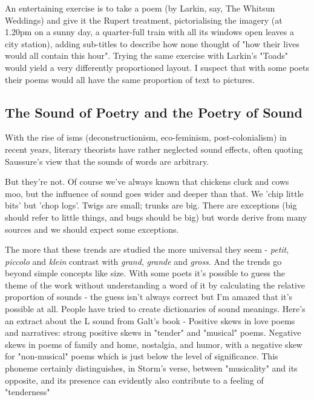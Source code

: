 \documentclass[11pt]{article}
\begin{document}
An entertaining exercise is to take a poem (by Larkin, say, The Whitsun Weddings) and give it the Rupert treatment, pictorialising the imagery (at 1.20pm on a sunny day, a quarter-full train with all its windows open leaves a city station), adding sub-titles to describe how none thought of "how their lives would all contain this hour". Trying the same exercise with Larkin's "Toads" would yield a very differently proportioned layout. I suspect that with some poets their poems would all have the same proportion of text to pictures.



\newpage\subsection{The Sound of Poetry and the Poetry of Sound}

 With the rise of isms (deconstructionism, eco-feminism, post-colonialism) in recent years, literary theorists have rather neglected sound effects, often quoting Saussure's view that the sounds of words are arbitrary.

But they're not. Of course we've always known that chickens cluck and cows moo, but the influence of sound goes wider and deeper than that. We 'chip little bits' but 'chop logs'. Twigs are small; trunks are big. There are exceptions (big should refer to little things, and bugs should be big) but words derive from many sources and we should expect some exceptions.

The more that these trends are studied the more universal they seem - \textit{petit}, \textit{piccolo} and \textit{klein} contrast with \textit{grand}, \textit{grande} and \textit{gross}. And the trends go beyond simple concepts like size. With some poets it's possible to guess the theme of the work without understanding a word of it by calculating the relative proportion of sounds - the guess isn't always correct but I'm amazed that it's possible at all. People have tried to create dictionaries of sound meanings. Here's an extract about the L sound from Galt's book - Positive skews in love poems and narratives: strong positive skews in "tender" and "musical" poems. Negative skews in poems of family and home, nostalgia, and humor, with a negative skew for "non-musical" poems which is just below the level of significance. This phoneme certainly distinguishes, in Storm's verse, between "musicality" and its opposite, and its presence can evidently also contribute to a feeling of "tenderness"
\end{document}
